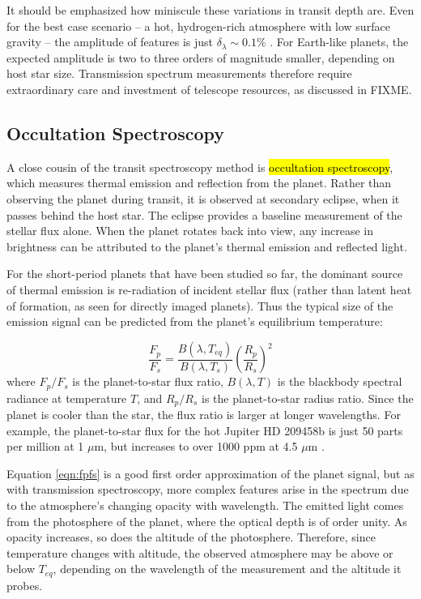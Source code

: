 \documentclass[graybox,natbib,nosecnum]{svmult}
\newcommand{\hbindex}[1]{\hl{#1}\index{#1}}  %
\begin{document}
It should be emphasized how miniscule these variations in transit depth are. Even for the best case scenario -- a hot, hydrogen-rich atmosphere with low surface gravity -- the amplitude of features is just $\delta_\lambda \sim0.1\%$ \citep[e.g. WASP 121-b;][]{evans16}. For Earth-like planets, the expected amplitude is two to three orders of magnitude smaller, depending on host star size. Transmission spectrum measurements therefore require extraordinary care and investment of telescope resources, as discussed in FIXME.

\subsection{Occultation Spectroscopy}
A close cousin of the transit spectroscopy method is \hbindex{occultation spectroscopy}, which measures thermal emission and reflection from the planet. Rather than observing the planet during transit, it is observed at secondary eclipse, when it passes behind the host star. The eclipse provides a baseline measurement of the stellar flux alone. When the planet rotates back into view, any increase in brightness can be attributed to the planet's thermal emission and reflected light.

For the short-period planets that have been studied so far, the dominant source of thermal emission is re-radiation of incident stellar flux (rather than latent heat of formation, as seen for directly imaged planets). Thus the typical size of the emission signal can be predicted from the planet's equilibrium temperature:

\begin{equation}
\label{eqn:fpfs}
\frac{F_p}{F_s} = \frac{B(\lambda, T_{eq})}{B(\lambda, T_s)}\left(\frac{R_p}{R_s}\right)^2
\end{equation}
where $F_p/F_s$ is the planet-to-star flux ratio, $B(\lambda, T)$ is the blackbody spectral radiance at temperature $T$, and $R_p/R_s$ is the planet-to-star radius ratio. Since the planet is cooler than the star, the flux ratio is larger at longer wavelengths. For example, the planet-to-star flux for the hot Jupiter HD 209458b is just 50 parts per million at 1 $\mu$m, but increases to over 1000 ppm at 4.5 $\mu$m \citep{line16}.

Equation \ref{eqn:fpfs} is a good first order approximation of the planet signal, but as with transmission spectroscopy, more complex features arise in the spectrum due to the atmosphere's changing opacity with wavelength. The emitted light comes from the photosphere of the planet, where the optical depth is of order unity.  As opacity increases, so does the altitude of the photosphere.  Therefore, since temperature changes with altitude, the observed atmosphere may be above or below $T_{eq}$, depending on the wavelength of the measurement and the altitude it probes. 
\end{document}
